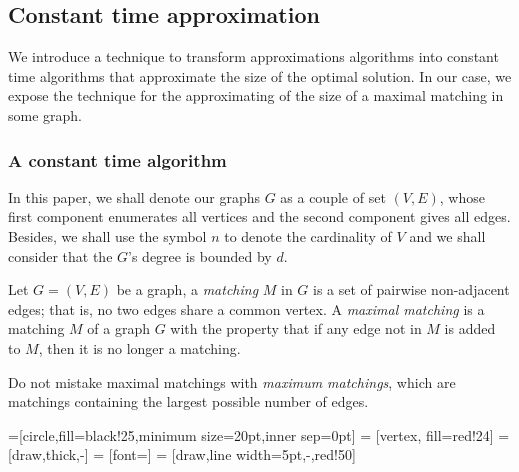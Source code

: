 

\subsection{Constant time approximation}

We introduce a technique to transform approximations algorithms
into constant time algorithms that approximate the size of the optimal solution. 
In our case, we expose the technique for the approximating of the size 
of a maximal matching in some graph.


\subsubsection{A constant time algorithm}

In this paper, we shall denote our graphs $G$ as a couple of set $(V,E)$, whose first
component enumerates all vertices and the second component gives all edges. Besides,
we shall use the symbol $n$ to denote the cardinality of $V$ and we shall consider 
that the $G$'s degree is bounded by $d$.

\begin{definition}
Let $G = (V,E)$ be a graph, a \emph{matching} $M$ in $G$ is a set of pairwise non-adjacent
edges; that is, no two edges share a common vertex. A \emph{maximal matching} is a matching $M$
of a graph $G$ with the property that if any edge not in $M$ is added to $M$, then it is no longer a matching.
\end{definition}

\begin{remark}
Do not mistake maximal matchings with \emph{maximum matchings}, which are matchings containing the largest possible number of edges.
\end{remark}

=[circle,fill=black!25,minimum size=20pt,inner sep=0pt]
 = [vertex, fill=red!24]
 = [draw,thick,-]
 = [font=\small]
 = [draw,line width=5pt,-,red!50]


